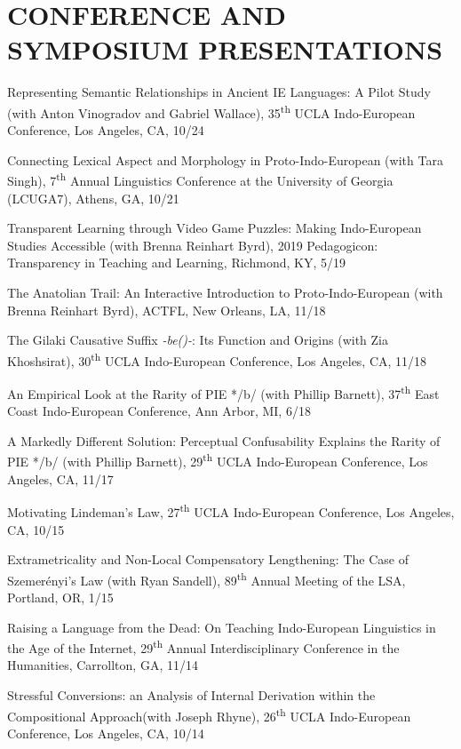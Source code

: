 \documentclass[paper=letter,fontsize=11pt]{scrartcl} %
\newcommand{\NewPart}[2]{\section*{\uppercase{#1} #2}}
\newcommand{\TalkEntry}[4]{
		\noindent #1, #2, #3 #4}
\begin{document}
\NewPart{Conference and Symposium Presentations}{}
\begin{etaremune}
\item\TalkEntry{Representing Semantic Relationships in Ancient IE Languages: A Pilot Study (with Anton Vinogradov and Gabriel Wallace)}{35\textsuperscript{th} UCLA Indo-European Conference, Los Angeles, CA}{10/24}
\item\TalkEntry{Connecting Lexical Aspect and Morphology in Proto-Indo-European (with Tara Singh)}{7\textsuperscript{th} Annual Linguistics Conference at the University of Georgia (LCUGA7), Athens, GA}{10/21}
\item\TalkEntry{Transparent Learning through Video Game Puzzles: Making Indo-European Studies Accessible (with Brenna Reinhart Byrd)}{2019 Pedagogicon: Transparency in Teaching and Learning, Richmond, KY}{5/19}
\item\TalkEntry{The Anatolian Trail: An Interactive Introduction to Proto-Indo-European (with Brenna Reinhart Byrd)}{ACTFL, New Orleans, LA}{11/18}
\item\TalkEntry{The Gilaki Causative Suffix \textit{-be(\textlengthmark)-}: Its Function and Origins (with Zia Khoshsirat)}{30\textsuperscript{th} UCLA Indo-European Conference, Los Angeles, CA}{11/18}
\item\TalkEntry{An Empirical Look at the Rarity of PIE */b/ (with Phillip Barnett)}{37\textsuperscript{th} East Coast Indo-European Conference, Ann Arbor, MI}{6/18}
\item\TalkEntry{A Markedly Different Solution: Perceptual Confusability Explains the Rarity of PIE */b/ (with Phillip Barnett)}{29\textsuperscript{th} UCLA Indo-European Conference, Los Angeles, CA}{11/17}
\item\TalkEntry{Motivating Lindeman’s Law}{27\textsuperscript{th} UCLA Indo-European Conference, Los Angeles, CA}{10/15}
\item\TalkEntry{Extrametricality and Non-Local Compensatory Lengthening: The Case of Szemerényi’s Law (with Ryan Sandell)}{89\textsuperscript{th} Annual Meeting of the LSA, Portland, OR}{1/15}
\item\TalkEntry{Raising a Language from the Dead: On Teaching Indo-European Linguistics in the Age of the Internet}{29\textsuperscript{th} Annual Interdisciplinary Conference in the Humanities, Carrollton, GA}{11/14}
\item\TalkEntry{Stressful Conversions: an Analysis of Internal Derivation within the Compositional Approach(with Joseph Rhyne)}{26\textsuperscript{th} UCLA Indo-European Conference, Los Angeles, CA}{10/14}

\end{etaremune}
\end{document}
